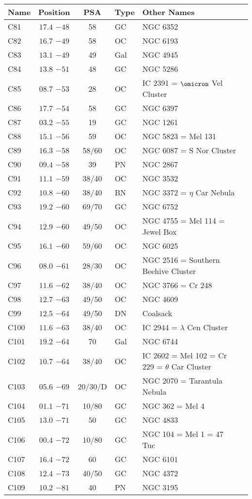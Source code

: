 \begin{table}[p]
\setlength{\tabcolsep}{3pt}
\small
\begin{tabular}{lcclll}
\hline
Name&Position&PSA&Type&Other Names\\
\hline
C81  &$17.4$ $-48$&58&GC &NGC 6352\\
C82  &$16.7$ $-49$&58&OC &NGC 6193\\
C83  &$13.1$ $-49$&49&Gal&NGC 4945\\
C84  &$13.8$ $-51$&48&GC &NGC 5286\\
C85  &$08.7$ $-53$&28&OC &IC 2391 = $\omicron$ Vel Cluster\\
C86  &$17.7$ $-54$&58&GC &NGC 6397\\
C87  &$03.2$ $-55$&19&GC &NGC 1261\\
C88  &$15.1$ $-56$&59&OC &NGC 5823 = Mel 131\\
C89  &$16.3$ $-58$&58/60&OC &NGC 6087 = S Nor Cluster\\
C90  &$09.4$ $-58$&39&PN &NGC 2867\\
C91  &$11.1$ $-59$&38/40&OC &NGC 3532\\
C92  &$10.8$ $-60$&38/40&BN &NGC 3372 = $\eta$ Car Nebula\\
C93  &$19.2$ $-60$&69/70&GC &NGC 6752\\
C94  &$12.9$ $-60$&49/50&OC &NGC 4755 = Mel 114 = Jewel Box\\
C95  &$16.1$ $-60$&59/60&OC &NGC 6025\\
C96  &$08.0$ $-61$&28/30&OC &NGC 2516 = Southern Beehive Cluster\\
C97  &$11.6$ $-62$&38/40&OC &NGC 3766 = Cr 248\\
C98  &$12.7$ $-63$&49/50&OC &NGC 4609\\
C99  &$12.5$ $-64$&49/50&DN &Coalsack\\
C100 &$11.6$ $-63$&38/40&OC &IC 2944 = $\lambda$ Cen Cluster\\
C101 &$19.2$ $-64$&70&Gal&NGC 6744\\
C102 &$10.7$ $-64$&38/40&OC &IC 2602 = Mel 102 = Cr 229 = $\theta$ Car Cluster\\
C103 &$05.6$ $-69$&20/30/D&OC &NGC 2070 = Tarantula Nebula\\
C104 &$01.1$ $-71$&10/80&GC &NGC 362 = Mel 4\\
C105 &$13.0$ $-71$&50&GC &NGC 4833\\
C106 &$00.4$ $-72$&10/80&GC &NGC 104 = Mel 1 = 47 Tuc\\
C107 &$16.4$ $-72$&60&GC &NGC 6101\\
C108 &$12.4$ $-73$&40/50&GC &NGC 4372\\
C109 &$10.2$ $-81$&40&PN &NGC 3195\\
\hline
\end{tabular}
\end{table}

